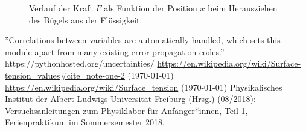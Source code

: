 \documentclass[11pt,a4paper]{article}
\begin{document}
\begin{figure}[p]
\centering
{}
\renewcommand\thefigure{B4}
\caption[Kraft/Höhe Diagramm Ethanol]{Verlauf der Kraft $F$ als Funktion der Position $x$ beim Herausziehen des B\"ugels aus der Fl\"ussigkeit.}
\label{ab4}
\end{figure}

\begin{thebibliography}{9}
''Correlations between variables are automatically handled, which sets this module apart from many existing error propagation codes.'' - https://pythonhosted.org/uncertainties/
 \url{https://en.wikipedia.org/wiki/Surface-tension_values#cite_note-one-2} (\today)
 \url{https://en.wikipedia.org/wiki/Surface_tension} (\today)
 Physikalisches Institut der Albert-Ludwigs-Universität Freiburg (Hrsg.) (08/2018): Versuchsanleitungen zum Physiklabor für Anfänger*innen, Teil 1, Ferienpraktikum im Sommersemester 2018.
\end{thebibliography}
\end{document}
